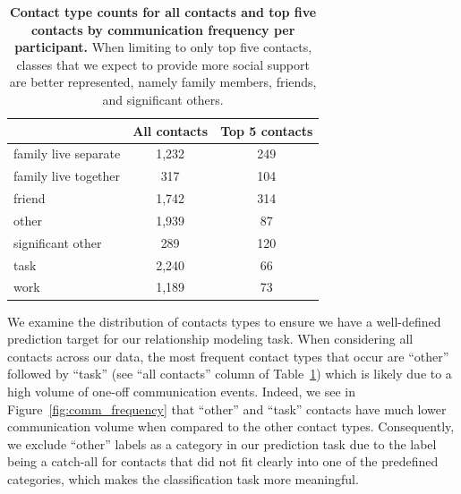 \documentclass[acmlarge]{acmart}
\begin{document}
\begin{table}[h]
    \centering
    \begin{tabular}{lcc} 
        \toprule
        {} & All contacts & Top 5 contacts \\
        \midrule
        family live separate & 1,232 & 249 \\
        family live together & 317 & 104 \\
        friend & 1,742 & 314 \\
        other & 1,939 & 87 \\
        significant other & 289 & 120\\
        task & 2,240 & 66 \\
        work & 1,189 & 73 \\
        \bottomrule
    \end{tabular}
    \caption{\textbf{Contact type counts for all contacts and top five contacts by communication frequency per participant.} When limiting to only top five contacts, classes that we expect to provide more social support are better represented, namely family members, friends, and significant others.}
    \label{tab:contact_types}
\end{table}

We examine the distribution of contacts types to ensure we have a well-defined prediction target for our relationship modeling task. When considering all contacts across our data, the most frequent contact types that occur are ``other'' followed by ``task'' (see ``all contacts'' column of Table~\ref{tab:contact_types}) which is likely due to a high volume of one-off communication events. Indeed, we see in Figure~\ref{fig:comm_frequency} that ``other'' and ``task'' contacts have much lower communication volume when compared to the other contact types. Consequently, we exclude ``other'' labels as a category in our prediction task due to the label being a catch-all for contacts that did not fit clearly into one of the predefined categories, which makes the classification task more meaningful.
\end{document}
